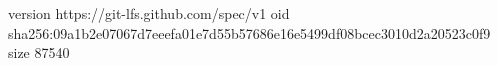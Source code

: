 version https://git-lfs.github.com/spec/v1
oid sha256:09a1b2e07067d7eeefa01e7d55b57686e16e5499df08bcec3010d2a20523c0f9
size 87540

